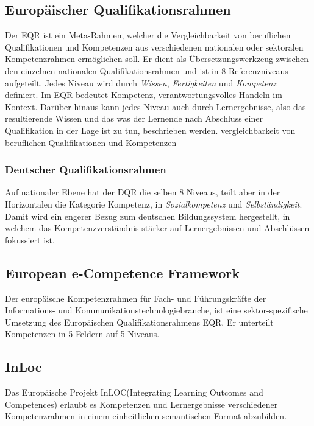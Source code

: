 \vspace{1em}
\subsection{Europäischer Qualifikationsrahmen}
Der EQR ist ein Meta-Rahmen, welcher die Vergleichbarkeit von beruflichen Qualifikationen und Kompetenzen aus verschiedenen nationalen oder sektoralen Kompetenzrahmen ermöglichen soll. Er dient als Übersetzungswerkzeug zwischen den einzelnen nationalen  Qualifikationsrahmen und ist in 8 Referenzniveaus aufgeteilt. Jedes Niveau wird durch  \textit{Wissen}, \textit{Fertigkeiten} und \textit{Kompetenz} definiert. Im EQR bedeutet Kompetenz, verantwortungsvolles Handeln im Kontext. Darüber hinaus kann jedes Niveau auch durch Lernergebnisse, also das resultierende Wissen und das was der Lernende nach Abschluss einer Qualifikation in der Lage ist zu tun, beschrieben werden. 
vergleichbarkeit von beruflichen Qualifikationen und Kompetenzen

\subsubsection{Deutscher Qualifikationsrahmen}

Auf nationaler Ebene hat der DQR die selben 8 Niveaus, teilt aber in der Horizontalen die  Kategorie Kompetenz, in \textit{Sozialkompetenz} und \textit{Selbständigkeit}. Damit wird ein engerer Bezug zum deutschen Bildungssystem hergestellt, in welchem das Kompetenzverständnis  stärker auf Lernergebnissen und Abschlüssen fokussiert ist.
\subsection{European e-Competence Framework}\label{e-CF}

Der europäische Kompetenzrahmen für Fach- und Führungskräfte der Informations- und Kommunikationstechnologiebranche, ist eine sektor-spezifische Umsetzung des Europäischen Qualifikationsrahmens EQR. Er unterteilt Kompetenzen in 5 Feldern auf 5 Niveaus. 
\subsection{InLoc}\label{inloc}

Das Europäische Projekt InLOC(Integrating Learning Outcomes and Competences) erlaubt es Kompetenzen und Lernergebnisse verschiedener Kompetenzrahmen in einem einheitlichen semantischen Format abzubilden. 


